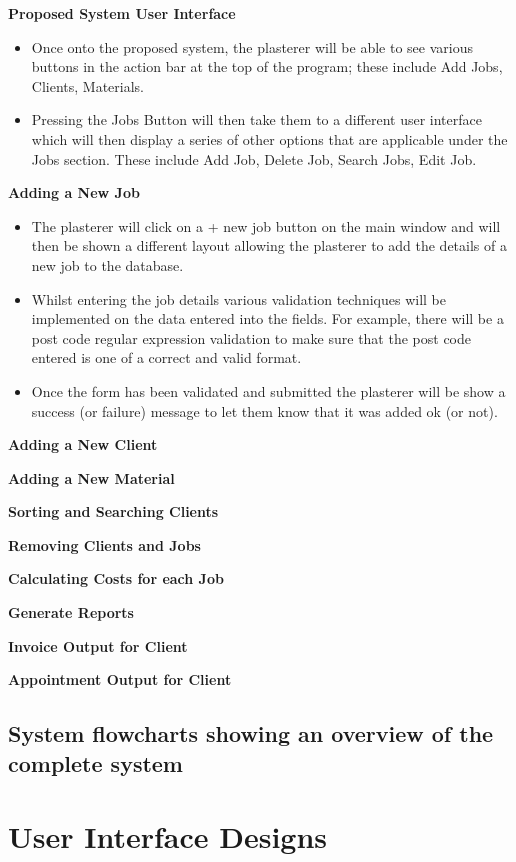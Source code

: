 \textbf{Proposed System User Interface}
	\begin{itemize}
		\item Once onto the proposed system, the plasterer will be able to see various buttons in the action bar at the top of the program; these include Add
Jobs, Clients, Materials.
		\item Pressing the Jobs Button will then take them to a different user interface which will then display a series of other options that are applicable under the Jobs section. These include Add Job, Delete Job, Search Jobs, Edit Job. 

	\end{itemize}
\textbf{Adding a New Job}
	\begin{itemize}
		\item The plasterer will click on a + new job button on the main window and will then be shown a different layout allowing the plasterer to add the details of a new job to the database.
		\item Whilst entering the job details various validation techniques will be implemented on the data entered into the fields. For example, there will be a post code regular expression validation to make sure that the post code entered is one of a correct and valid format.
		\item Once the form has been validated and submitted the plasterer will be show a success (or failure) message to let them know that it was added ok (or not).
	\end{itemize}

\textbf{Adding a New Client}

\textbf{Adding a New Material}

\textbf{Sorting and Searching Clients}

\textbf{Removing Clients and Jobs}

\textbf{Calculating Costs for each Job}

\textbf{Generate Reports}

\textbf{Invoice Output for Client}

\textbf{Appointment Output for Client}

\subsection{System flowcharts showing an overview of the complete system}

\section{User Interface Designs}


